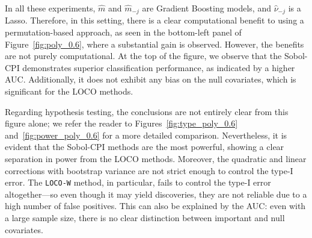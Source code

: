 \documentclass{article}
\theoremstyle{plain}
\theoremstyle{definition}
\theoremstyle{remark}
\begin{document}
In all these experiments, \( \widehat{m} \) and \( \widehat{m}_{-j} \) are Gradient Boosting models, and \( \widehat{\nu}_{-j} \) is a Lasso. Therefore, in this setting, there is a clear computational benefit to using a permutation-based approach, as seen in the bottom-left panel of Figure~\ref{fig:poly_0.6}, where a substantial gain is observed. However, the benefits are not purely computational. At the top of the figure, we observe that the Sobol-CPI demonstrates superior classification performance, as indicated by a higher AUC. Additionally, it does not exhibit any bias on the null covariates, which is significant for the LOCO methods.

Regarding hypothesis testing, the conclusions are not entirely clear from this figure alone; we refer the reader to Figures~\ref{fig:type_poly_0.6} and~\ref{fig:power_poly_0.6} for a more detailed comparison. Nevertheless, it is evident that the Sobol-CPI methods are the most powerful, showing a clear separation in power from the LOCO methods. Moreover, the quadratic and linear corrections with bootstrap variance are not strict enough to control the type-I error. The \texttt{LOCO-W} method, in particular, fails to control the type-I error altogether—so even though it may yield discoveries, they are not reliable due to a high number of false positives. This can also be explained by the AUC: even with a large sample size, there is no clear distinction between important and null covariates.


\end{document}
